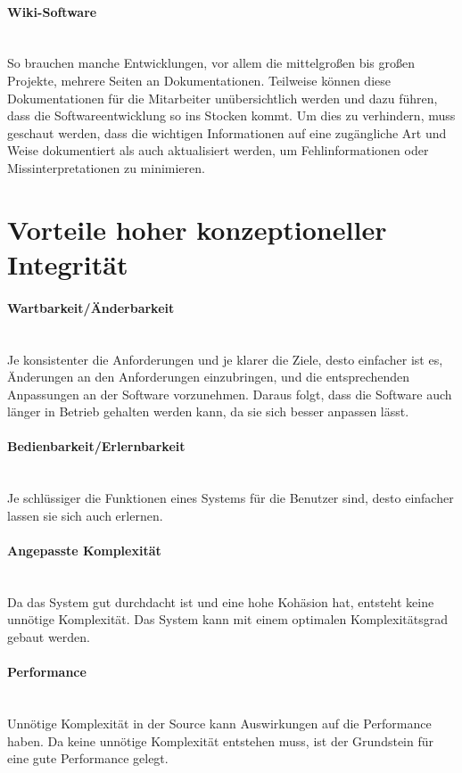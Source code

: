 \documentclass[a4paper, ngerman, 12pt, usenames, dvipsnames]{article}
\begin{document}
\paragraph{Wiki-Software}\mbox{} \\
So brauchen manche Entwicklungen, vor allem die mittelgroßen bis großen Projekte, mehrere Seiten an Dokumentationen. Teilweise können diese Dokumentationen für die Mitarbeiter unübersichtlich werden und dazu führen, dass die Softwareentwicklung so ins Stocken kommt. Um dies zu verhindern, muss geschaut werden, dass die wichtigen Informationen auf eine zugängliche Art und Weise dokumentiert als auch aktualisiert werden, um Fehlinformationen oder Missinterpretationen zu minimieren.


\section{Vorteile hoher konzeptioneller Integrität}
\paragraph{Wartbarkeit/Änderbarkeit}\mbox{} \\
Je konsistenter die Anforderungen und je klarer die Ziele, desto einfacher ist es, Änderungen an den Anforderungen einzubringen, und die entsprechenden Anpassungen an der Software vorzunehmen. 
Daraus folgt, dass die Software auch länger in Betrieb gehalten werden kann, da sie sich besser anpassen lässt.
\paragraph{Bedienbarkeit/Erlernbarkeit}\mbox{} \\
Je schlüssiger die Funktionen eines Systems für die Benutzer sind, desto einfacher lassen sie sich auch erlernen.
\paragraph{Angepasste Komplexität}\mbox{} \\
Da das System gut durchdacht ist und eine hohe Kohäsion hat, entsteht keine unnötige Komplexität. Das System kann mit einem optimalen Komplexitätsgrad gebaut werden.
\paragraph{Performance}\mbox{} \\
Unnötige Komplexität in der Source kann Auswirkungen auf die Performance haben. Da keine unnötige Komplexität entstehen muss, ist der Grundstein für eine gute Performance gelegt.
\end{document}
